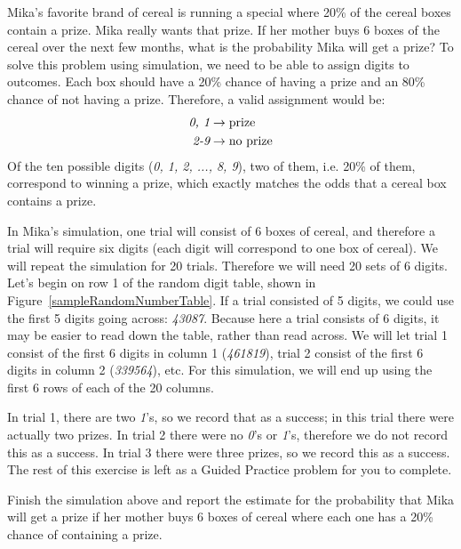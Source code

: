 \begin{examplewrap}
\begin{nexample}{Mika's favorite brand of cereal is running a special where 20\% of the cereal boxes contain a prize. Mika really wants that prize. If her mother buys 6 boxes of the cereal over the next few months, what is the probability Mika will get a prize?}
To solve this problem using simulation, we need to be able to assign digits to outcomes. Each box should have a 20\% chance of having a prize and an 80\% chance of not having a prize. Therefore, a valid assignment would be:
\begin{align*}
\emph{0, 1} &\rightarrow \text{prize}\\
\emph{2-9} &\rightarrow \text{no prize}
\end{align*}
Of the ten possible digits (\emph{0, 1, 2, ..., 8, 9}), two of them, i.e. 20\% of them, correspond to winning a prize, which exactly matches the odds that a cereal box contains a prize.

In Mika's simulation, one trial will consist of 6 boxes of cereal, and therefore a trial will require six digits (each digit will correspond to one box of cereal). We will repeat the simulation for 20 trials. Therefore we will need 20 sets of 6 digits. Let's begin on row 1 of the random digit table, shown in Figure~\ref{sampleRandomNumberTable}. If a trial consisted of 5 digits, we could use the first 5 digits going across: \emph{43087}. Because here a trial consists of 6 digits, it may be easier to read down the table, rather than read across. We will let trial 1 consist of the first 6 digits in column 1 (\emph{461819}), trial 2 consist of the first 6 digits in column 2 (\emph{339564}), etc. For this simulation, we will end up using the first 6 rows of each of the 20 columns. 

In trial 1, there are two \emph{1}'s, so we record that as a success; in this trial there were actually two prizes. In trial 2 there were no \emph{0}'s or \emph{1}'s, therefore we do not record this as a success. In trial 3 there were three prizes, so we record this as a success. The rest of this exercise is left as a Guided Practice problem for you to complete.
\end{nexample}
\end{examplewrap}



\begin{exercisewrap}
\begin{nexercise}Finish the simulation above and report the estimate for the probability that Mika will get a prize if her mother buys 6 boxes of cereal where each one has a 20\% chance of containing a prize.\footnotemark
\end{nexercise}
\end{exercisewrap}

